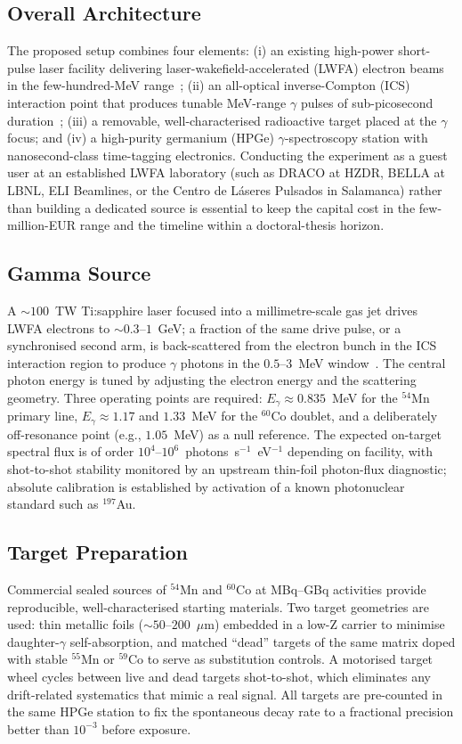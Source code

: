 \documentclass[conference]{IEEEtran}
\begin{document}
\subsection{Overall Architecture}
The proposed setup combines four elements: (i) an existing high-power short-pulse laser facility delivering laser-wakefield-accelerated (LWFA) electron beams in the few-hundred-MeV range~\cite{esarey2009lwfa}; (ii) an all-optical inverse-Compton (ICS) interaction point that produces tunable MeV-range $\gamma$ pulses of sub-picosecond duration~\cite{powers2014allopticalics}; (iii) a removable, well-characterised radioactive target placed at the $\gamma$ focus; and (iv) a high-purity germanium (HPGe) $\gamma$-spectroscopy station with nanosecond-class time-tagging electronics. Conducting the experiment as a guest user at an established LWFA laboratory (such as DRACO at HZDR, BELLA at LBNL, ELI Beamlines, or the Centro de L\'aseres Pulsados in Salamanca) rather than building a dedicated source is essential to keep the capital cost in the few-million-EUR range and the timeline within a doctoral-thesis horizon.

\subsection{Gamma Source}
A $\sim 100$~TW Ti:sapphire laser focused into a millimetre-scale gas jet drives LWFA electrons to $\sim 0.3\text{--}1$~GeV; a fraction of the same drive pulse, or a synchronised second arm, is back-scattered from the electron bunch in the ICS interaction region to produce $\gamma$ photons in the $0.5\text{--}3$~MeV window~\cite{esarey2009lwfa,powers2014allopticalics}. The central photon energy is tuned by adjusting the electron energy and the scattering geometry. Three operating points are required: $E_\gamma \approx 0.835$~MeV for the $^{54}$Mn primary line, $E_\gamma \approx 1.17$ and $1.33$~MeV for the $^{60}$Co doublet, and a deliberately off-resonance point (e.g., $1.05$~MeV) as a null reference. The expected on-target spectral flux is of order $10^{4}\text{--}10^{6}$~photons~s$^{-1}$~eV$^{-1}$ depending on facility, with shot-to-shot stability monitored by an upstream thin-foil photon-flux diagnostic; absolute calibration is established by activation of a known photonuclear standard such as $^{197}$Au.

\subsection{Target Preparation}
Commercial sealed sources of $^{54}$Mn and $^{60}$Co at MBq--GBq activities provide reproducible, well-characterised starting materials. Two target geometries are used: thin metallic foils ($\sim 50$--$200$~$\mu$m) embedded in a low-Z carrier to minimise daughter-$\gamma$ self-absorption, and matched ``dead'' targets of the same matrix doped with stable $^{55}$Mn or $^{59}$Co to serve as substitution controls. A motorised target wheel cycles between live and dead targets shot-to-shot, which eliminates any drift-related systematics that mimic a real signal. All targets are pre-counted in the same HPGe station to fix the spontaneous decay rate to a fractional precision better than $10^{-3}$ before exposure.
\end{document}
